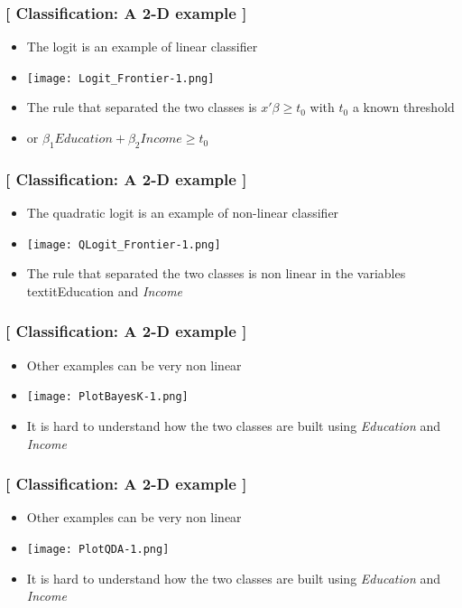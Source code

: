 \documentclass[xcolor=x11names,compress, aspectratio=169]{beamer}
\renewcommand{\(}{\begin{columns}}
\renewcommand{\)}{\end{columns}}
\newcommand{\<}[1]{\begin{column}{#1}}
\renewcommand{\>}{\end{column}}
\begin{document}
\begin{frame} %
\frametitle{\textcolor{brique}{[ Classification:  A 2-D example ]}}
\pause
\begin{itemize}[<+->]
  \item The logit is an example of linear classifier
  \item[] \begin{center}\texttt{[image: Logit\_Frontier-1.png]} \end{center}
  \item The rule that separated the two classes is $ x'\beta \geq t_0$ with $t_0$ a known threshold
  \item[] or $\beta_1 Education + \beta_2 Income \geq t_0$ 
 
\end{itemize}
\end{frame}

\begin{frame} %
\frametitle{\textcolor{brique}{[ Classification:  A 2-D example ]}}
\pause
\begin{itemize}[<+->]
  \item The quadratic logit is an example of non-linear classifier
  \item[] \begin{center}\texttt{[image: QLogit\_Frontier-1.png]} \end{center}
  \item The rule that separated the two classes is non linear in the variables textit{Education}  and \textit{Income} 
\end{itemize}
\end{frame}


\begin{frame} %
\frametitle{\textcolor{brique}{[ Classification:  A 2-D example ]}}
\pause
\begin{itemize}[<+->]
  \item Other examples can be very non linear
  \item[] \begin{center}\texttt{[image: PlotBayesK-1.png]} \end{center}
  \item It is hard to understand how the two classes  are built using \textit{Education}  and \textit{Income}
\end{itemize}
\end{frame}


\begin{frame} %
\frametitle{\textcolor{brique}{[ Classification:  A 2-D example ]}}
\pause
\begin{itemize}[<+->]
  \item Other examples can be very non linear
  \item[] \begin{center}\texttt{[image: PlotQDA-1.png]} \end{center}
  \item It is hard to understand how the two classes  are built using \textit{Education}  and \textit{Income}
\end{itemize}
\end{frame}
\end{document}
